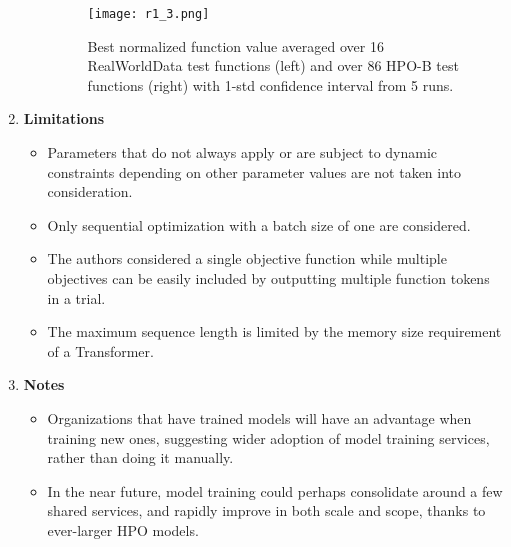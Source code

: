 \documentclass[11pt]{article}
\begin{document}
\begin{enumerate}
\begin{itemize}
        \medskip
        \begin{minipage}{\linewidth}
        \begin{figure}[H]
            \centering
            \texttt{[image: r1\_3.png]}
            \caption{Best normalized function value averaged over 16 RealWorldData test functions (left) and over 86 HPO-B test functions (right) with 1-std confidence interval from 5 runs.}
            \label{fig:my_label}
        \end{figure}
        \end{minipage}
    \end{itemize}
\item \textbf{Limitations}
\begin{itemize}
    \item Parameters that do not always apply or are subject to dynamic constraints depending on other parameter values are not taken into consideration.
    \item Only sequential optimization with a batch size of one are considered.
   \item The authors considered a single objective function while multiple objectives can be easily included by outputting multiple function tokens in a trial. 
    \item The maximum sequence length is limited by the memory size requirement of a Transformer.
\end{itemize}
\item \textbf{Notes}
\begin{itemize}
    \item  Organizations that have trained models will have an advantage when training new ones, suggesting wider adoption of model training services, rather than doing it manually.
    \item In the near future, model training could perhaps consolidate around a few shared services, and rapidly improve in both scale and scope, thanks to ever-larger HPO models.
\end{itemize}
\end{enumerate}
\nocite{*}
\pagebreak


\end{document}
